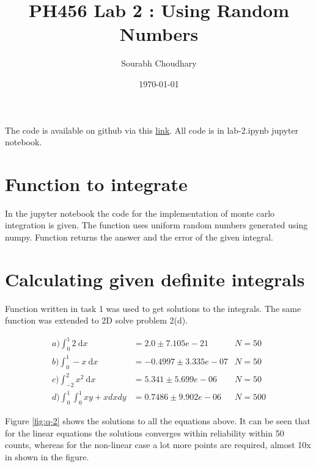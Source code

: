 \documentclass{article}
\title{PH456 Lab 2 : Using Random Numbers} %
\author{Sourabh Choudhary} %
\date{\today} %
\begin{document}

\maketitle %

The code is available on github via this \href{https://github.com/sourabh-ch/ph456-computational/tree/master/lab-2}{link}. 
All code is in lab-2.ipynb jupyter notebook. 

\section{Function to integrate}

\noindent
In the jupyter notebook the code for the implementation of monte carlo integration is given. The 
function uses uniform random numbers generated using numpy. Function returns the answer and the error of the given 
integral.

\section{Calculating given definite integrals}

\noindent
Function written in task 1 was used to get solutions to the integrals. The same function was 
extended to 2D solve problem 2(d).

\begin{align}
a) \int_{0}^{1} 2 \mathrm{~d} x \quad       & = 2.0     \pm 7.105e-21        &N = 50\\ 
b) \int_{0}^{1}-x \mathrm{~d} x \quad       & = -0.4997 \pm 3.335e-07        &N = 50\\
c) \int_{-2}^{2} x^{2} \mathrm{~d} x        & = 5.341   \pm 5.699e-06        &N = 50\\
d) \int_{0}^{1} \int_{0}^{1} x y+x d x d y  & = 0.7486  \pm 9.902e-06        &N = 500
\end{align}


\noindent
Figure \ref*{fig:q-2} shows the solutions to all the equations above. It can be seen that for the 
linear equations the solutions converges within reliability within 50 counts, 
whereas for the non-linear case a lot more points are required, almost 10x in shown in the figure.
\end{document}
